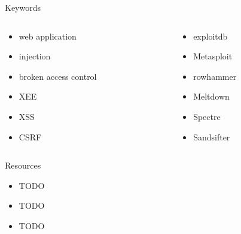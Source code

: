 \documentclass{curs}
\begin{document}
\begin{frame}{Keywords}
  \begin{columns}
    \begin{column}{0.5\textwidth}
      \begin{itemize}
        \item web application
        \item injection
        \item broken access control
        \item XEE
        \item XSS
        \item CSRF
      \end{itemize}
    \end{column}
    \begin{column}{0.5\textwidth}
      \begin{itemize}
        \item exploitdb
        \item Metasploit
        \item rowhammer
        \item Meltdown
        \item Spectre
        \item Sandsifter
      \end{itemize}
    \end{column}
  \end{columns}
\end{frame}

\begin{frame}{Resources}
  \begin{itemize}
    \item TODO
    \item TODO
    \item TODO
  \end{itemize}
\end{frame}
\end{document}
